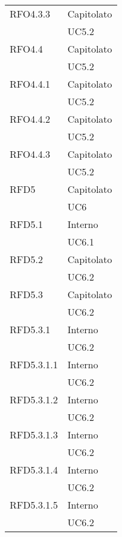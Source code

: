 \begin{center}
\begin{longtable}{ | >{\centering\arraybackslash}m{5cm} | >{\centering\arraybackslash}m{5cm} | }
        RFO4.3.3 & Capitolato\\
            & UC5.2 \\
\hline

        RFO4.4 & Capitolato\\
            & UC5.2 \\
\hline

        RFO4.4.1 & Capitolato\\
            & UC5.2 \\
\hline

        RFO4.4.2 & Capitolato\\
            & UC5.2 \\
\hline

        RFO4.4.3 & Capitolato\\
            & UC5.2 \\
\hline

        RFD5 & Capitolato\\
            & UC6 \\
\hline

        RFD5.1 & Interno\\
            & UC6.1 \\
\hline

        RFD5.2 & Capitolato\\
            & UC6.2 \\
\hline

        RFD5.3 & Capitolato\\
            & UC6.2 \\
\hline

        RFD5.3.1 & Interno\\
            & UC6.2 \\
\hline

        RFD5.3.1.1 & Interno\\
            & UC6.2 \\
\hline

        RFD5.3.1.2 & Interno\\
            & UC6.2 \\
\hline

        RFD5.3.1.3 & Interno\\
            & UC6.2 \\
\hline

        RFD5.3.1.4 & Interno\\
            & UC6.2 \\
\hline

        RFD5.3.1.5 & Interno\\
            & UC6.2 \\
\hline


\end{longtable}
\end{center}
